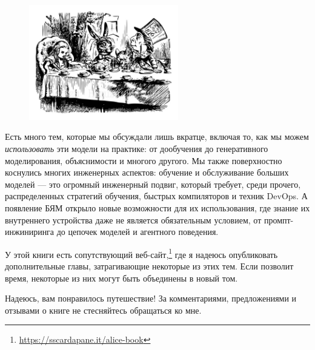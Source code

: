 \documentclass[12pt]{book}
\begin{document}
\begin{figure}
\includegraphics[width=6.5cm]{images/alice_mad_hatter.jpg}
\end{figure} 

Есть много тем, которые мы обсуждали лишь вкратце, включая то, как мы можем \textit{использовать} эти модели на практике: от дообучения до генеративного моделирования, объяснимости и многого другого. Мы также поверхностно коснулись многих инженерных аспектов: обучение и обслуживание больших моделей — это огромный инженерный подвиг, который требует, среди прочего, распределенных стратегий обучения, быстрых компиляторов и техник DevOps. А появление БЯМ открыло новые возможности для их использования, где знание их внутреннего устройства даже не является обязательным условием, от промпт-инжиниринга до цепочек моделей и агентного поведения.

У этой книги есть сопутствующий веб-сайт,\footnote{\url{https://sscardapane.it/alice-book}} где я надеюсь опубликовать дополнительные главы, затрагивающие некоторые из этих тем. Если позволит время, некоторые из них могут быть объединены в новый том.

Надеюсь, вам понравилось путешествие! За комментариями, предложениями и отзывами о книге не стесняйтесь обращаться ко мне.

\newpage
\pagecolor{white}
\pagestyle{fancy}

\appendix
{}




\footnotesize

\end{document}
